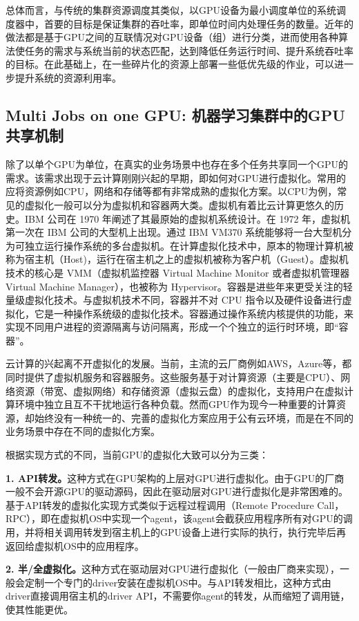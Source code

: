 总体而言，与传统的集群资源调度其类似，以GPU设备为最小调度单位的系统调度器中，首要的目标是保证集群的吞吐率，即单位时间内处理任务的数量。近年的做法都是基于GPU之间的互联情况对GPU设备（组）进行分类，进而使用各种算法使任务的需求与系统当前的状态匹配，达到降低任务运行时间、提升系统吞吐率的目标。在此基础上，在一些碎片化的资源上部署一些低优先级的作业，可以进一步提升系统的资源利用率。

\subsection{Multi Jobs on one GPU: 机器学习集群中的GPU共享机制}
除了以单个GPU为单位，在真实的业务场景中也存在多个任务共享同一个GPU的需求。该需求出现于云计算刚刚兴起的早期，即如何对GPU进行虚拟化。常用的应将资源例如CPU，网络和存储等都有非常成熟的虚拟化方案。以CPU为例，常见的虚拟化一般可以分为虚拟机和容器两大类。虚拟机有着比云计算更悠久的历史。IBM 公司在 1970 年阐述了其最原始的虚拟机系统设计。在 1972 年，虚拟机第一次在 IBM 公司的大型机上出现。通过 IBM VM370 系统能够将一台大型机分为可独立运行操作系统的多台虚拟机。在计算虚拟化技术中，原本的物理计算机被称为宿主机（Host)，运行在宿主机之上的虚拟机被称为客户机（Guest）。虚拟机技术的核心是 VMM（虚拟机监控器 Virtual Machine Monitor 或者虚拟机管理器 Virtual Machine Manager），也被称为 Hypervisor。容器是进些年来更受关注的轻量级虚拟化技术。与虚拟机技术不同，容器并不对 CPU 指令以及硬件设备进行虚拟化，它是一种操作系统级的虚拟化技术。容器通过操作系统内核提供的功能，来实现不同用户进程的资源隔离与访问隔离，形成一个个独立的运行时环境，即“容器”。

云计算的兴起离不开虚拟化的发展。当前，主流的云厂商例如AWS，Azure等，都同时提供了虚拟机服务和容器服务。这些服务基于对计算资源（主要是CPU）、网络资源（带宽、虚拟网络）和存储资源（虚拟云盘）的虚拟化，支持用户在虚拟计算环境中独立且互不干扰地运行各种负载。然而GPU作为现今一种重要的计算资源，却始终没有一种统一的、完善的虚拟化方案应用于公有云环境，而是在不同的业务场景中存在不同的虚拟化方案。

根据实现方式的不同，当前GPU的虚拟化大致可以分为三类：

\textbf{1. API转发。}这种方式在GPU架构的上层对GPU进行虚拟化。由于GPU的厂商一般不会开源GPU的驱动源码，因此在驱动层对GPU进行虚拟化是非常困难的。基于API转发的虚拟化实现方式类似于远程过程调用（Remote Procedure Call，RPC），即在虚拟机OS中实现一个agent，该agent会截获应用程序所有对GPU的调用，并将相关调用转发到宿主机上的GPU设备上进行实际的执行，执行完毕后再返回给虚拟机OS中的应用程序。

\textbf{2. 半/全虚拟化。}这种方式在驱动层对GPU进行虚拟化（一般由厂商来实现），一般会定制一个专门的driver安装在虚拟机OS中。与API转发相比，这种方式由driver直接调用宿主机的driver API，不需要你agent的转发，从而缩短了调用链，使其性能更优。

